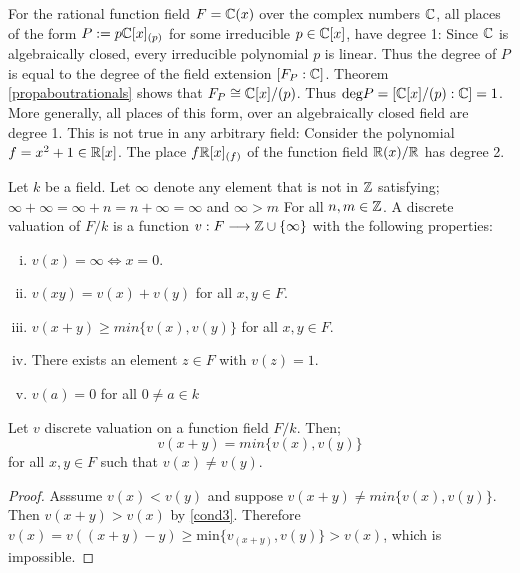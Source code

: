 \begin{example}
	For the rational function field $F = \mathbb{C}(x)$ over the complex numbers $\mathbb{C}$, 
	all places of the form $P :=p\mathbb{C}[x]_{(p)}$ for some irreducible $p \in \mathbb{C}[x]$, 
	have degree 1: Since $\mathbb{C} $ is algebraically closed, every irreducible
	polynomial $p$ is linear. Thus the degree of $P$ is equal 
	to the degree of the field extension $[F_P : \mathbb{C}]$. Theorem \ref{propaboutrationals}
	shows that $F_P \cong \mathbb{C}[x]/(p)$. Thus $\text{deg} P = [\mathbb{C}[x]/(p):\mathbb{C}] = 1$. 
	More generally, all places of this form, over an algebraically closed field are degree 1.
	This is not true in any arbitrary field: Consider the polynomial $f = x^2 +1 \in \mathbb{R} [x]$. The
	place $f\mathbb{R}[x]_{(f)}$ of the function field $\mathbb{R}(x)/\mathbb{R}$ has degree 2. 
\end{example}


\begin{definition}  \label{discreteValuation}
	Let $k$ be a field. Let $\infty$ denote any element that is not in $\mathbb{Z}$ 
	satisfying; $\infty + \infty = \infty + n = n+ \infty = \infty  $ and 
	$\infty > m $ For all $n,m \in \mathbb{Z}$.  A discrete valuation of $F/k$ is a 
	function $ v : F \longrightarrow \mathbb{Z} \cup \lbrace \infty \rbrace $ with the
	following properties: 
	\begin{enumerate}[i)]
		\item \label{cond1} $v(x) = \infty \Leftrightarrow x = 0 $.
		\item \label{cond2} $v(xy) = v(x) + v(y) $ for all $x,y \in F$.
		\item \label{cond3} $v(x + y) \geq min \lbrace  v(x),v(y) \rbrace  $ for all $x,y \in F$.
		\item \label{cond4} There exists an element $z \in F$ with $v(z)=1$.
		\item \label{cond5} $v(a)=0 $ for all $0 \neq a \in k$
	\end{enumerate}
\end{definition}

\begin{lemma} \label{strongtriange}
	Let $v$ discrete valuation on a function field $F/k$. Then;
	$$v(x + y) = min \lbrace v(x),v(y) \rbrace $$ for all $x,y\in  F$ such that $v(x) \neq v(y) $. 
\end{lemma}

\begin{proof}
	Asssume $v(x) < v(y)$ and suppose $v(x + y) \neq min \lbrace v(x),v(y) \rbrace $.
	Then $v(x+y) > v(x)$ by \eqref{cond3}. Therefore 
	$v(x) = v((x+y) - y) \geq \text{min} \lbrace v_(x+y),v(y) \rbrace > v(x)$, 
	which is impossible.  
\end{proof}

